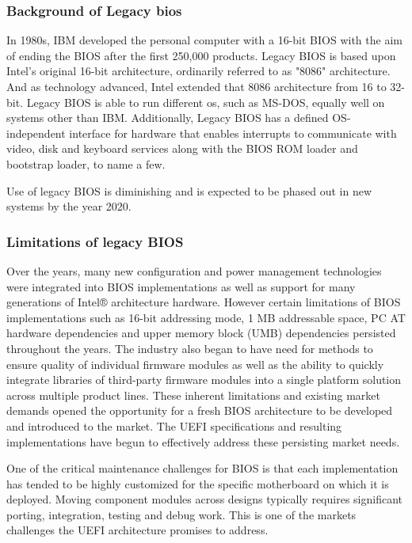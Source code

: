 \subsubsection{Background of Legacy \gls{bios}}
In 1980s, IBM developed the personal computer with a 16-bit BIOS with the aim of ending the BIOS after the first 250,000 products. Legacy BIOS is based upon Intel's original 16-bit architecture, ordinarily referred to as  "8086" architecture. And as technology advanced, Intel extended that 8086 architecture from 16 to 32-bit.
Legacy BIOS is able to run different \gls{os}, such as MS-DOS, equally well on systems other than IBM. Additionally, Legacy BIOS has a defined OS-independent interface for hardware that enables interrupts to communicate with video, disk and keyboard services along with the BIOS ROM loader and bootstrap loader, to name a few.

Use of legacy BIOS is diminishing and is expected to be phased out in new systems by the year 2020.

\subsubsection{Limitations of legacy BIOS}
Over the years, many new configuration and power management technologies were integrated
into BIOS implementations as well as support for many generations of Intel® architecture
hardware. However certain limitations of BIOS implementations such as 16-bit addressing mode,
1 MB addressable space, PC AT hardware dependencies and upper memory block (UMB)
dependencies persisted throughout the years. The industry also began to have need for methods to
ensure quality of individual firmware modules as well as the ability to quickly integrate libraries
of third-party firmware modules into a single platform solution across multiple product lines.
These inherent limitations and existing market demands opened the opportunity for a fresh BIOS
architecture to be developed and introduced to the market. The UEFI specifications and resulting
implementations have begun to effectively address these persisting market needs.

One of the critical maintenance challenges for BIOS is that each implementation has tended to
be highly customized for the specific motherboard on which it is deployed. Moving component
modules across designs typically requires significant porting, integration, testing and debug work.
This is one of the markets challenges the UEFI architecture promises to address.

